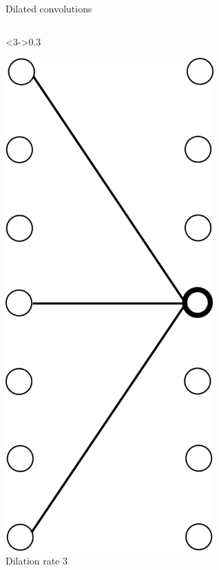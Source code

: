 \documentclass[handout,xcolor=pdftex,dvipsnames,table,mathserif]{beamer}
\begin{document}
\begin{frame}{Dilated convolutions}
\begin{columns}
    \begin{column}<3->{0.3\textwidth}
      \begin{center}
        \includegraphics[width=0.60\textwidth]{dil_conv3.png}
        \\ \scriptsize{Dilation rate 3}
      \end{center}
    \end{column}


  \end{columns}


\end{frame}
\end{document}
